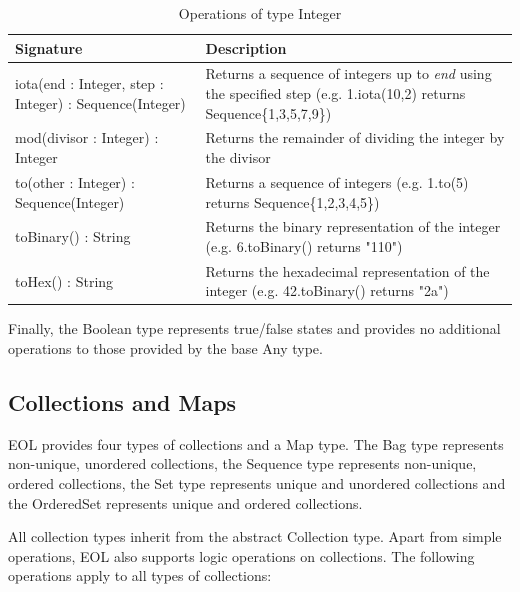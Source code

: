 \begin{longtabu} {|p{6.5cm}|X|}
\caption{Operations of type Integer}
\label{tab:IntegerOperations}\\
\hline

    \textbf{Signature} & \textbf{Description} \\\hline

    iota(end : Integer, step : Integer) : Sequence(Integer) & Returns a sequence of integers up to \emph{end} using the specified step (e.g. 1.iota(10,2) returns Sequence\{1,3,5,7,9\})\\\hline
    
    mod(divisor : Integer) : Integer & Returns the remainder of dividing the integer by the divisor\\\hline

    to(other : Integer) : Sequence(Integer) & Returns a sequence of integers (e.g. 1.to(5) returns Sequence\{1,2,3,4,5\})\\\hline
    
    toBinary() : String & Returns the binary representation of the integer (e.g. 6.toBinary() returns "110")\\\hline
    
    toHex() : String & Returns the hexadecimal representation of the integer (e.g. 42.toBinary() returns "2a")\\\hline

\end{longtabu}

Finally, the Boolean type represents true/false states and provides no additional operations to those provided by the base Any type.

\subsection{Collections and Maps} 
\label{sec:Design.EOL.Collections}

EOL provides four types of collections and a Map type. The Bag type represents non-unique, unordered collections, the Sequence type represents non-unique, ordered collections, the Set type represents unique and unordered collections and the OrderedSet represents unique and ordered collections.

All collection types inherit from the abstract Collection type. Apart from simple operations, EOL also supports logic operations on collections. The following operations apply to all types of collections:
\newpage

